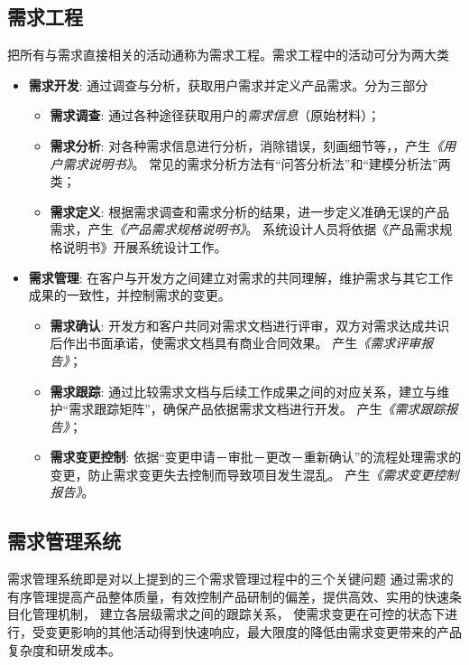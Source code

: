 \documentclass[12pt, a4paper, oneside]{ctexart}
\begin{document}
\subsection{需求工程}

把所有与需求直接相关的活动通称为需求工程。需求工程中的活动可分为两大类
\begin{itemize}
    \item \textbf{需求开发}: 通过调查与分析，获取用户需求并定义产品需求。分为三部分
        \begin{itemize}
            \item \textbf{需求调查}: 通过各种途径获取用户的\textit{需求信息}（原始材料）；
            \item \textbf{需求分析}: 对各种需求信息进行分析，消除错误，刻画细节等，，产生\textit{《用户需求说明书》}。
                常见的需求分析方法有“问答分析法”和“建模分析法”两类；
            \item  \textbf{需求定义}: 根据需求调查和需求分析的结果，进一步定义准确无误的产品需求，产生\textit{《产品需求规格说明书》}。
                系统设计人员将依据《产品需求规格说明书》开展系统设计工作。
        \end{itemize}
    \item \textbf{需求管理}: 在客户与开发方之间建立对需求的共同理解，维护需求与其它工作成果的一致性，并控制需求的变更。
        \begin{itemize}
            \item \textbf{需求确认}: 开发方和客户共同对需求文档进行评审，双方对需求达成共识后作出书面承诺，使需求文档具有商业合同效果。
            产生\textit{《需求评审报告》}；
            \item \textbf{需求跟踪}: 通过比较需求文档与后续工作成果之间的对应关系，建立与维护“需求跟踪矩阵”，确保产品依据需求文档进行开发。
            产生\textit{《需求跟踪报告》}；
            \item \textbf{需求变更控制}: 依据“变更申请－审批－更改－重新确认”的流程处理需求的变更，防止需求变更失去控制而导致项目发生混乱。
            产生\textit{《需求变更控制报告》}。
        \end{itemize}
\end{itemize}

\subsection{需求管理系统}

需求管理系统即是对以上提到的三个需求管理过程中的三个关键问题
通过需求的有序管理提高产品整体质量，有效控制产品研制的偏差，提供高效、实用的快速条目化管理机制，
建立各层级需求之间的跟踪关系，
使需求变更在可控的状态下进行，受变更影响的其他活动得到快速响应，最大限度的降低由需求变更带来的产品复杂度和研发成本。
\end{document}
